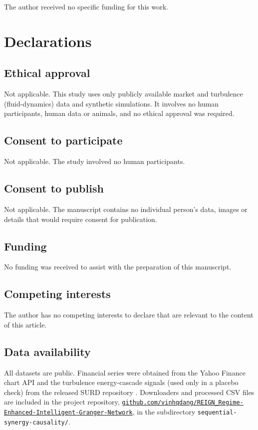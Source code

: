 \documentclass[pdflatex,sn-mathphys-ay]{sn-jnl}%
\theoremstyle{thmstyleone}%
\theoremstyle{thmstyletwo}%
\theoremstyle{thmstylethree}%
\begin{document}
The author received no specific funding for this work.

\section*{Declarations}\label{sec:decl}

\subsection*{Ethical approval}
Not applicable. This study uses only publicly available market and turbulence (fluid-dynamics)
data and synthetic simulations. It involves no human participants, human data or animals,
and no ethical approval was required.

\subsection*{Consent to participate}
Not applicable. The study involved no human participants.

\subsection*{Consent to publish}
Not applicable. The manuscript contains no individual person's data, images or details
that would require consent for publication.

\subsection*{Funding}
No funding was received to assist with the preparation of this manuscript.

\subsection*{Competing interests}
The author has no competing interests to declare that are relevant to the content of this
article.

\subsection*{Data availability}
All datasets are public. Financial series were obtained from the Yahoo Finance chart API and the turbulence energy-cascade signals (used only in a placebo check) from
the released SURD repository \citep{surd2024}. Downloaders and processed CSV files are included in the
project repository,
\href{https://github.com/vinhqdang/REIGN_Regime-Enhanced-Intelligent-Granger-Network}{\texttt{github.com/vinhqdang/REIGN\_Regime-Enhanced-Intelligent-Granger-Network}},
in the subdirectory \texttt{sequential-synergy-causality/}.
\end{document}
